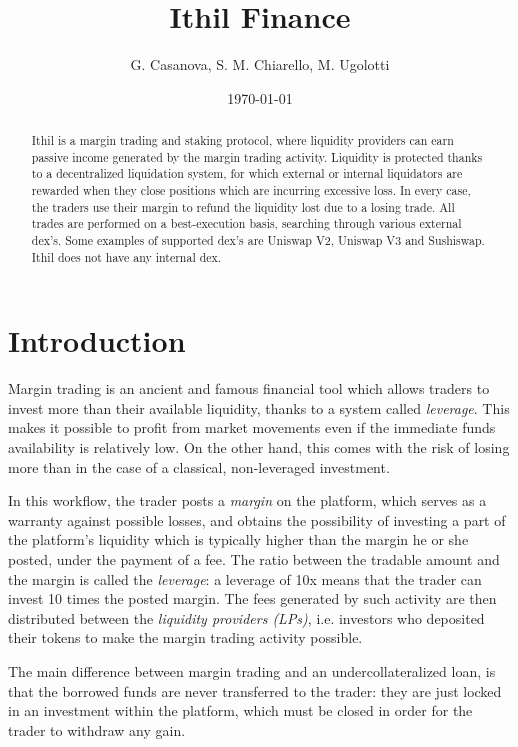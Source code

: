 \documentclass [10pt, fancyhdr, twoside] {article}
\begin{document}
\title{Ithil Finance}
\author {G. Casanova,  S. M. Chiarello, M. Ugolotti}

\date{\today}

\maketitle

\begin{abstract}
Ithil is a margin trading and staking protocol, where liquidity providers can earn passive income generated by the margin trading activity. Liquidity is protected thanks to a decentralized liquidation system, for which external or internal liquidators are rewarded when they close positions which are incurring excessive loss. In every case, the traders use their margin to refund the liquidity lost due to a losing trade. All trades are performed on a best-execution basis, searching through various external dex's. Some examples of supported dex's are Uniswap V2, Uniswap V3 and Sushiswap. Ithil does not have any internal dex.
\end{abstract}

\section{Introduction}
Margin trading is an ancient and famous financial tool which allows traders to invest more than their available liquidity, thanks to a system called \textit{leverage}. This makes it possible to profit from market movements even if the immediate funds availability is relatively low. On the other hand, this comes with the risk of losing more than in the case of a classical, non-leveraged investment.

In this workflow, the trader posts a \textit{margin} on the platform, which serves as a warranty against possible losses, and obtains the possibility of investing a part of the platform's liquidity which is typically higher than the margin he or she posted, under the payment of a fee. The ratio between the tradable amount and the margin is called the \textit{leverage}: a leverage of 10x means that the trader can invest 10 times the posted margin. The fees generated by such activity are then distributed between the \textit{liquidity providers (LPs)}, i.e. investors who deposited their tokens to make the margin trading activity possible.

The main difference between margin trading and an undercollateralized loan, is that the borrowed funds are never transferred to the trader: they are just locked in an investment within the platform, which must be closed in order for the trader to withdraw any gain.
\end{document}
